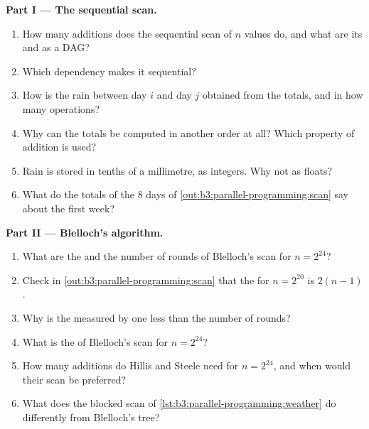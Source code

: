 \begin{problem}
\medskip\noindent\textbf{Part I --- The sequential scan.}
\begin{enumerate}
  \item How many additions does the sequential scan of $n$ values do, and what are its  and  as a DAG?
  \item Which dependency makes it sequential?
  \item How is the rain between day $i$ and day $j$ obtained from the totals, and in how many operations?
  \item Why can the totals be computed in another order at all? Which property of addition is used?
  \item Rain is stored in tenths of a millimetre, as integers. Why not as floats?
  \item What do the totals of the 8 days of \cref{out:b3:parallel-programming:scan} say about the first week?
\end{enumerate}

\medskip\noindent\textbf{Part II --- Blelloch's algorithm.}
\begin{enumerate}[resume]
  \item What are the  and the number of rounds of Blelloch's scan for $n = 2^{24}$?
  \item Check in \cref{out:b3:parallel-programming:scan} that the  for $n = 2^{20}$ is $2(n - 1)$.
  \item Why is the  measured by  one less than the number of rounds?
  \item What is the  of Blelloch's scan for $n = 2^{24}$?
  \item How many additions do Hillis and Steele need for $n = 2^{24}$, and when would their scan be preferred?
  \item What does the blocked scan of \cref{lst:b3:parallel-programming:weather} do differently from Blelloch's tree?
\end{enumerate}


\end{problem}
